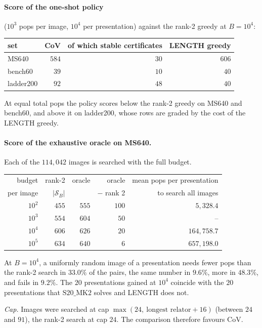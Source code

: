 \documentclass[11pt]{article}
\theoremstyle{definition}
\theoremstyle{remark}
\newcommand{\Sol}{\mathcal{S}}
\newcommand{\SMK}{\mathrm{S20\_MK2}}
\begin{document}
\paragraph{Score of the one-shot policy} ($10^3$ pops per image, $10^4$ per presentation) against the rank-2 greedy at
$B=10^4$:
\begin{center}
\begin{tabular}{lrrr}
\toprule
set & CoV & of which stable certificates & LENGTH greedy\\
\midrule
MS640 & $584$ & $30$ & $606$\\
bench60 & $39$ & $10$ & $40$\\
ladder200 & $92$ & $48$ & $40$\\
\bottomrule
\end{tabular}
\end{center}
At equal total pops the policy scores below the rank-2 greedy on MS640 and bench60, and above it on ladder200, whose
rows are graded by the cost of the LENGTH greedy.

\paragraph{Score of the exhaustive oracle on MS640.} Each of the $114{,}042$ images is searched with the full budget.
\begin{center}
\begin{tabular}{rrrrr}
\toprule
budget & rank-2 & oracle & oracle & mean pops per presentation\\
per image & $|\Sol_B|$ & & $-$ rank 2 & to search all images\\
\midrule
$10^2$ & $455$ & $555$ & $100$ & $5{,}328.4$\\
$10^3$ & $554$ & $604$ & $50$ & --\\
$10^4$ & $606$ & $626$ & $20$ & $164{,}758.7$\\
$10^5$ & $634$ & $640$ & $6$ & $657{,}198.0$\\
\bottomrule
\end{tabular}
\end{center}
At $B=10^4$, a uniformly random image of a presentation needs fewer pops than the rank-2 search in $33.0\%$ of the
pairs, the same number in $9.6\%$, more in $48.3\%$, and fails in $9.2\%$. The $20$ presentations gained at $10^4$
coincide with the $20$ presentations that $\SMK$ solves and LENGTH does not.

\emph{Cap.} Images were searched at cap $\max(24,\ \text{longest relator}+16)$ (between $24$ and $91$), the rank-2
search at cap $24$. The comparison therefore favours CoV.
\end{document}
